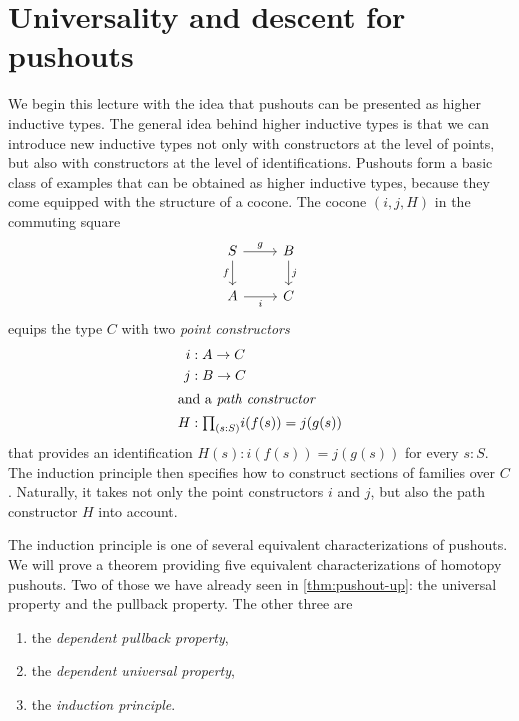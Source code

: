 \chapter{Universality and descent for pushouts}\label{chap:descent}

We begin this lecture with the idea that pushouts can be presented as higher inductive types. The general idea behind higher inductive types is that we can introduce new inductive types not only with constructors at the level of points, but also with constructors at the level of identifications. Pushouts form a basic class of examples that can be obtained as higher inductive types, because they come equipped with the structure of a cocone. The cocone $(i,j,H)$ in the commuting square
\begin{equation*}
  \begin{tikzcd}
    S \arrow[r,"g"] \arrow[d,swap,"f"] & B \arrow[d,"j"] \\
    A \arrow[r,swap,"i"] & C
  \end{tikzcd}
\end{equation*}
equips the type $C$ with two \emph{point constructors}
\begin{align*}
  i & : A \to C \\
  j & : B \to C \\
  \intertext{and a \emph{path constructor}}
  H & : \prd{s:S}i(f(s)) = j(g(s))
\end{align*}
that provides an identification $H(s):i(f(s))=j(g(s))$ for every $s:S$. The induction principle then specifies how to construct sections of families over $C$. Naturally, it takes not only the point constructors $i$ and $j$, but also the path constructor $H$ into account. 

The induction principle is one of several equivalent characterizations of pushouts. We will prove a theorem providing five equivalent characterizations of homotopy pushouts. Two of those we have already seen in \cref{thm:pushout-up}: the universal property and the pullback property. The other three are
\begin{enumerate}
\item the \emph{dependent pullback property},
\item the \emph{dependent universal property},
\item the \emph{induction principle}.
\end{enumerate}

